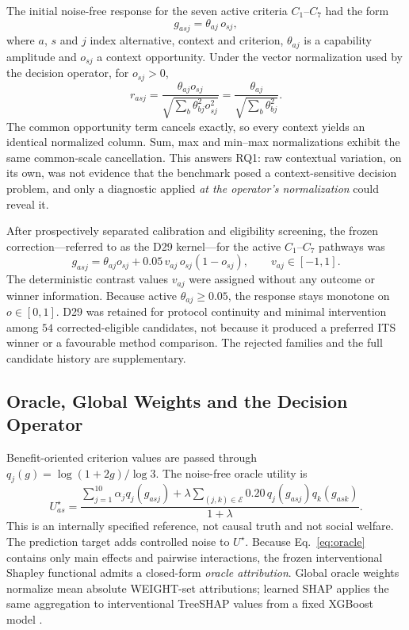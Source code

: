 \documentclass[runningheads,orivec]{llncs}
\newcommand{\XGB}{XGBoost}
\begin{document}
The initial noise-free response for the seven active criteria $C_1$--$C_7$ had the form
\begin{equation}
g_{asj}=\theta_{aj}\,o_{sj},
\label{eq:separable}
\end{equation}
where $a$, $s$ and $j$ index alternative, context and criterion, $\theta_{aj}$ is a
capability amplitude and $o_{sj}$ a context opportunity. Under the vector
normalization used by the decision operator, for $o_{sj}>0$,
\begin{equation}
r_{asj}
=\frac{\theta_{aj}o_{sj}}{\sqrt{\sum_b\theta_{bj}^2o_{sj}^2}}
=\frac{\theta_{aj}}{\sqrt{\sum_b\theta_{bj}^2}}.
\label{eq:collapse}
\end{equation}
The common opportunity term cancels exactly, so every context yields an identical
normalized column. Sum, max and min--max normalizations exhibit the same common-scale
cancellation. This answers RQ1: raw contextual variation, on its own, was not evidence
that the benchmark posed a context-sensitive decision problem, and only a diagnostic
applied \emph{at the operator's normalization} could reveal it.

After prospectively separated calibration and eligibility screening, the frozen
correction---referred to as the D29 kernel---for the active $C_1$--$C_7$ pathways was
\begin{equation}
g_{asj}=\theta_{aj}o_{sj}+0.05\,v_{aj}\,o_{sj}(1-o_{sj}),
\qquad v_{aj}\in[-1,1].
\label{eq:d29}
\end{equation}
The deterministic contrast values $v_{aj}$ were assigned without any outcome or winner
information. Because active $\theta_{aj}\ge0.05$, the response stays monotone on
$o\in[0,1]$. D29 was retained for protocol continuity and minimal intervention among
$54$ corrected-eligible candidates, not because it produced a preferred ITS winner or a
favourable method comparison. The rejected families and the full candidate history are
supplementary.

\subsection{Oracle, Global Weights and the Decision Operator}
\label{sec:oracle}

Benefit-oriented criterion values are passed through $q_j(g)=\log(1+2g)/\log 3$. The
noise-free oracle utility is
\begin{equation}
U_{as}^{\star}
=\frac{\sum_{j=1}^{10}\alpha_j q_j(g_{asj})
+\lambda\sum_{(j,k)\in\mathcal E}0.20\,q_j(g_{asj})q_k(g_{ask})}
{1+\lambda}.
\label{eq:oracle}
\end{equation}
This is an internally specified reference, not causal truth and not social welfare.
The prediction target adds controlled noise to $U^\star$. Because
Eq.~\eqref{eq:oracle} contains only main effects and pairwise interactions, the frozen
interventional Shapley functional admits a closed-form \emph{oracle attribution}.
Global oracle weights normalize mean absolute WEIGHT-set attributions; learned SHAP
applies the same aggregation to interventional TreeSHAP values from a fixed \XGB{}
model \cite{chen2016xgboost,lundberg2020trees}.
\end{document}
